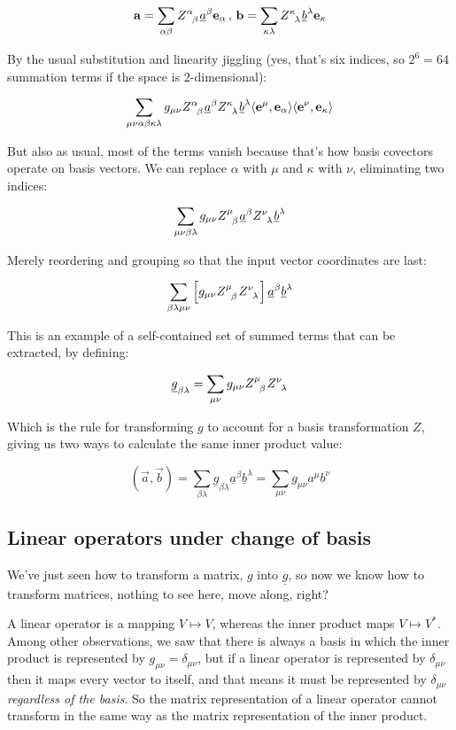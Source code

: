 $$
\vec{a} = \sum_{\alpha\beta} Z\indices{^\alpha_\beta} \underline{a}^{\beta} \vec{e}_{\alpha}
\, , \,
\vec{b} = \sum_{\kappa\lambda} Z\indices{^\kappa_\lambda} \underline{b}^{\lambda} \vec{e}_{\kappa}
$$

By the usual substitution and linearity jiggling (yes, that's six indices, so $2^6 = 64$ summation terms if the space is $2$-dimensional):

$$
\sum_{\mu\nu\alpha\beta\kappa\lambda} g_{\mu\nu} Z\indices{^\alpha_\beta} \underline{a}^{\beta} Z\indices{^\kappa_\lambda} \underline{b}^{\lambda} \langle \vec{e}^\mu, \vec{e}_\alpha \rangle \langle \vec{e}^\nu, \vec{e}_\kappa \rangle
$$

But also as usual, most of the terms vanish because that's how basis covectors operate on basis vectors. We can replace $\alpha$ with $\mu$ and $\kappa$ with $\nu$, eliminating two indices:

$$
\sum_{\mu\nu\beta\lambda} g_{\mu\nu} Z\indices{^\mu_\beta} \underline{a}^{\beta} Z\indices{^\nu_\lambda} \underline{b}^{\lambda}
$$

Merely reordering and grouping so that the input vector coordinates are last:

$$
\sum_{\beta\lambda\mu\nu} \left[g_{\mu\nu} Z\indices{^\mu_\beta} Z\indices{^\nu_\lambda} \right] \underline{a}^{\beta} \underline{b}^{\lambda} 
$$

This is an example of a self-contained set of summed terms that can be extracted, by defining:

$$
\underline{g}_{\beta\lambda} = 
\sum_{\mu\nu} g_{\mu\nu} Z\indices{^\mu_\beta} Z\indices{^\nu_\lambda}
$$

Which is the rule for transforming $g$ to account for a basis transformation $Z$, giving us two ways to calculate the same inner product value:

$$
(\vec{a}, \vec{b})
= 
\sum_{\beta\lambda} \underline{g}_{\beta\lambda} \underline{a}^{\beta} \underline{b}^{\lambda}
= 
\sum_{\mu\nu} g_{\mu\nu} a^{\mu} b^{\nu}
$$

\subsection{Linear operators under change of basis}

We've just seen how to transform a matrix, $g$ into $\underline{g}$, so now we know how to transform matrices, nothing to see here, move along, right?

A linear operator is a mapping $V \mapsto V$, whereas the inner product maps $V \mapsto V^*$. Among other observations, we saw that there is always a basis in which the inner product is represented by $g_{\mu\nu} = \delta_{\mu\nu}$, but if a linear operator is represented by $\delta_{\mu\nu}$ then it maps every vector to itself, and that means it must be represented by $\delta_{\mu\nu}$ \textit{regardless of the basis}. So the matrix representation of a linear operator cannot transform in the same way as the matrix representation of the inner product.



